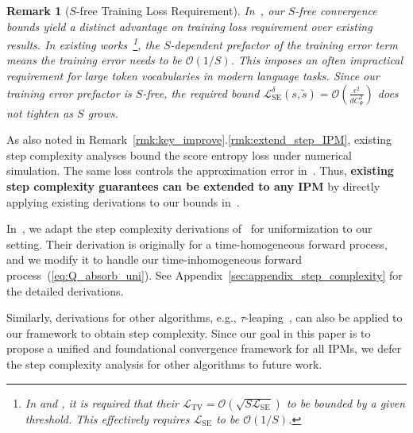 \documentclass{article} %
\newtheorem{remark}[theorem]{Remark}
\def\eqref#1{equation~\ref{#1}}
\newcommand{\LSE}{\mathcal{L}_{\mathrm{SE}}}
\renewcommand{\eqref}[1]{\textup{(\ref{#1})}}
\begin{document}
\begin{remark}[$S$-free Training Loss Requirement]
    In~, our $S$-free convergence bounds yield a distinct advantage on training loss requirement over existing results. In existing works~\citep{liang2026absorb,liang2026convergence}\footnote{In \citep[Assumption~1 \& Proposition~1]{liang2026absorb} and \citep[Assumption~1 \& Proposition~A1]{liang2026convergence}, it is required that their $\mathcal{L}_\mathrm{TV}=\mathcal{O}(\sqrt{S \LSE})$ to be bounded by a given threshold. This effectively requires $\LSE$ to be $\mathcal{O}(1/S)$.}, the $S$-dependent prefactor of the training error term means the training error needs to be $\mathcal{O}(1/S)$. This imposes an often impractical requirement for large token vocabularies in modern language tasks. Since our training error prefactor is $S$-free, the required bound $\LSE^\delta(s, \tilde{s}) = \mathcal{O}(\frac{\epsilon^2}{d C_\Psi^2})$ does not tighten as $S$ grows.  
\end{remark}



As also noted in Remark~\ref{rmk:key_improve}.\ref{rmk:extend_step_IPM}, existing step complexity analyses bound the score entropy loss under numerical simulation. The same loss controls the approximation error in~. Thus, \textbf{existing step complexity guarantees can be extended to any IPM} by directly applying existing derivations to our bounds in~. 

In~, we adapt the step complexity derivations of~\cite{liang2026absorb,ren2025discrete} for uniformization to our setting. Their derivation is originally for a time-homogeneous forward process, and we modify it to handle our time-inhomogeneous forward process~\eqref{eq:Q_absorb_uni}. See Appendix~\ref{sec:appendix_step_complexity} for the detailed derivations. 

Similarly, derivations for other algorithms, e.g., $\tau$-leaping~\citep{liang2026absorb,dmitriev2026efficient}, can also be applied to our framework to obtain step complexity. Since our goal in this paper is to propose a unified and foundational convergence framework for all IPMs, we defer the step complexity analysis for other algorithms to future work.
\end{document}
